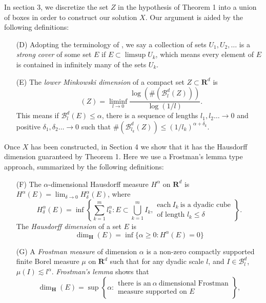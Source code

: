 \documentclass[dvipsnames]{article}
\theoremstyle{plain}
\theoremstyle{plain}
\DeclareMathOperator{\lhdim}{\underline{\dim}_{\mathbf{M}}}
\begin{document}
In section 3, we discretize the set $Z$ in the hypothesis of Theorem 1 into a union of boxes in order to construct our solution $X$. Our argument is aided by the following definitions:

\begin{enumerate}
	\item[(D)] Adopting the terminology of \cite{KatzTao}, we say a collection of sets $U_1, U_2, \dots$ is a {\it strong cover} of some set $E$ if $E \subset \limsup U_k$, which means every element of $E$ is contained in infinitely many of the sets $U_k$.

	\item[(E)] The {\it lower Minkowski dimension} of a compact set $Z \subset \mathbf{R}^d$ is
	\begin{equation} \label{lowerminkdim}
		\lhdim(Z) = \liminf_{l \to 0} \frac{\log( \#( \mathcal{B}^d_l(Z) ) )}{\log(1/l)}.
	\end{equation}
	This means if $\mathcal{B}^d_l(E) \leq \alpha$, there is a sequence of lengths $l_1, l_2 \dots \to 0$ and positive $\delta_1, \delta_2 \dots \to 0$ such that $\#(\mathcal{B}^d_{l_k}(Z)) \leq (1/l_k)^{\alpha + \delta_k}$.
\end{enumerate}

Once $X$ has been constructed, in Section 4 we show that it has the Hausdorff dimension guaranteed by Theorem 1. Here we use a Frostman's lemma type approach, summarized by the following definitions:

\begin{enumerate}
	\item[(F)] The $\alpha$-dimensional Hausdorff measure $H^\alpha$ on $\mathbf{R}^d$ is $H^\alpha(E) = \lim_{\delta \to 0} H^\alpha_\delta(E)$, where
	\[ H^\alpha_\delta(E) = \inf \left\{ \sum_{k = 1}^m l_k^\alpha : E \subset \bigcup_{k = 1}^m I_k, \begin{array}{c} \text{each}\ I_k\ \text{is a dyadic cube}\\
		\text{of length $l_k \leq \delta$} \end{array} \right\}. \]
	The {\it Hausdorff dimension} of a set $E$ is
	\[ \dim_{\mathbf{H}}(E) = \inf \{ \alpha \geq 0 : H^\alpha(E) = 0 \} \]


	\item[(G)] A {\it Frostman measure} of dimension $\alpha$ is a non-zero compactly supported finite Borel measure $\mu$ on $\mathbf{R}^d$ such that for any dyadic scale $l$, and $I \in \mathcal{B}^d_l$, $\mu(I) \lesssim l^\alpha$. {\it Frostman's lemma} shows that
	\[
		\dim_{\mathbf{H}}(E) = \sup \left\{ \alpha: \begin{array}{c} \text{there is an}\ \alpha\ \text{dimensional Frostman}\\
	\text{measure supported on $E$} \end{array} \right\}, \]
\end{enumerate}
\end{document}
